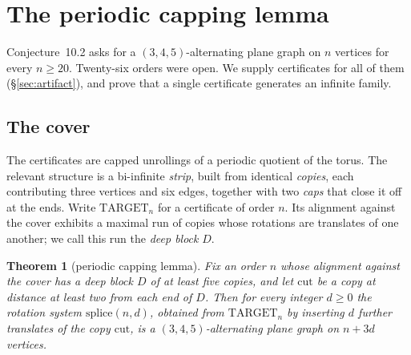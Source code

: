 \documentclass[11pt,a4paper]{amsart}
\theoremstyle{plain}
\newtheorem{theorem}{Theorem}[section]
\theoremstyle{definition}
\begin{document}
\section{The periodic capping lemma}\label{sec:pumping}

Conjecture~10.2 asks for a $(3,4,5)$-alternating plane graph on $n$ vertices for
every $n \ge 20$. Twenty-six orders were open. We supply certificates for all of
them (\S\ref{sec:artifact}), and prove that a single certificate generates an
infinite family.

\subsection{The cover}

The certificates are capped unrollings of a periodic quotient of the torus. The
relevant structure is a bi-infinite \emph{strip}, built from identical
\emph{copies}, each contributing three vertices and six edges, together with two
\emph{caps} that close it off at the ends. Write $\mathrm{TARGET}_n$ for a
certificate of order $n$. Its alignment against the cover exhibits a maximal run
of copies whose rotations are translates of one another; we call this run the
\emph{deep block} $D$.

\begin{theorem}[periodic capping lemma]\label{thm:pumping}
Fix an order $n$ whose alignment against the cover has a deep block $D$ of at
least five copies, and let $\mathrm{cut}$ be a copy at distance at least two
from each end of $D$. Then for every integer $d \ge 0$ the rotation
system $\mathrm{splice}(n,d)$, obtained from $\mathrm{TARGET}_n$ by inserting
$d$ further translates of the copy $\mathrm{cut}$, is a $(3,4,5)$-alternating
plane graph on $n + 3d$ vertices.
\end{theorem}
\end{document}
